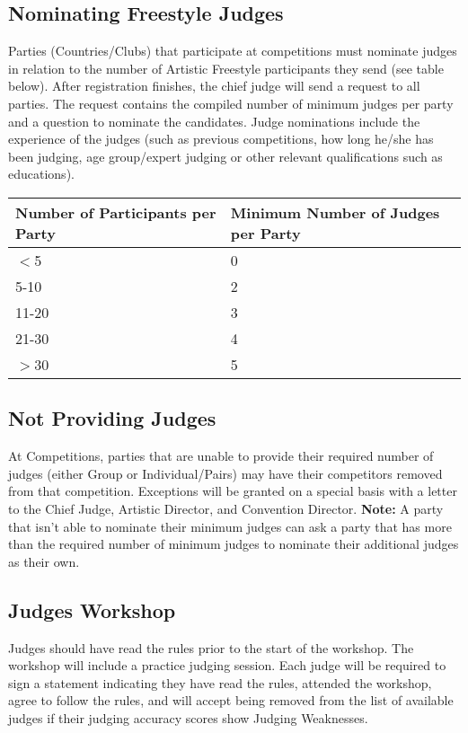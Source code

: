 \subsection{Nominating Freestyle Judges \label{subsec:freestyle_judging-panel_nominating-freestyle-judges}} %
Parties (Countries/Clubs) that participate at competitions must nominate judges in relation to the number of Artistic Freestyle participants they send (see table below).
After registration finishes, the chief judge will send a request to all parties.
The request contains the compiled number of minimum judges per party and a question to nominate the candidates.
Judge nominations include the experience of the judges (such as previous competitions, how long he/she has been judging, age group/expert judging or other relevant qualifications such as educations).

\begin{tabular}{|l|l|}
\hline
\textbf{Number of Participants per Party} & \textbf{Minimum Number of Judges per Party} \\
\hline
$<$5 & 0 \\
\hline
5-10 & 2 \\
\hline
11-20 & 3 \\
\hline
21-30 & 4 \\
\hline
$>$30 & 5 \\
\hline
\end{tabular}

\subsection{Not Providing Judges} %
At Competitions, parties that are unable to provide their required number of judges (either Group or Individual/Pairs) may have their competitors removed from that competition.
Exceptions will be granted on a special basis with a letter to the Chief Judge, Artistic Director, and Convention Director.
\textbf{Note:} A party that isn't able to nominate their minimum judges can ask a party that has more than the required number of minimum judges to nominate their additional judges as their own.

\subsection{Judges Workshop}
Judges should have read the rules prior to the start of the workshop.
The workshop will include a practice judging session.
Each judge will be required to sign a statement indicating they have read the rules, attended the workshop, agree to follow the rules, and will accept being removed from the list of available judges if their judging accuracy scores show Judging Weaknesses.%

